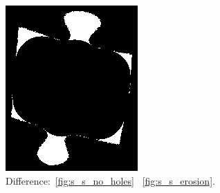 \documentclass{article}
\begin{document}
\begin{figure}
\begin{subfigure}{0.3\textwidth}
    \includegraphics[width=\linewidth]{pictures/remove_knobs_knob_pixels.png}
    \caption{Difference:~\cref{fig:s_s_no_holes} \textminus~\cref{fig:s_s_erosion}.}
    \label{fig:s_s_no_holes_minus_expansion}
  \end{subfigure}
  \hfill
  \begin{subfigure}{0.3\textwidth}
    \centering

\end{subfigure}
\end{figure}
\end{document}
